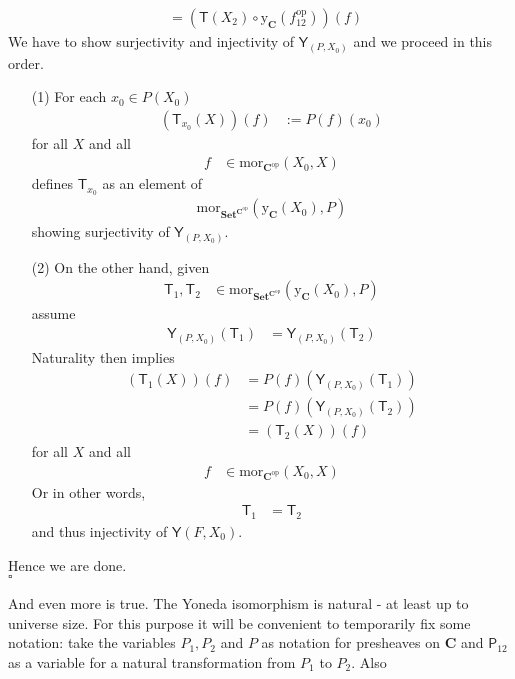 \begin{prf}
\begin{align*}
  &=
  \left(
    \mathsf{T}(X_{2})
    \circ
    \mathrm{y}_{\mathbf{C}}(f_{12}^{\textrm{op}})
  \right)
  (f)
\end{align*}
We have to show surjectivity and injectivity of $\mathsf{Y}_{(P,X_{0})}$ and we proceed in this order.
\begin{enumerate}
\item[(1)]
For each $x_{0} \in P(X_{0})$
\begin{align*}
  (\mathsf{T}_{x_{0}}(X))(f)
  &:=
  P(f)(x_{0})
\end{align*}
for all $X$ and all
\begin{align*}
  f
  &\in
  \mathrm{mor}_{\mathbf{C}^{\mathrm{op}}}
  (X_{0},X)
\end{align*}
defines $\mathsf{T}_{x_{0}}$ as an element of
\begin{align*}
  \mathrm{mor}_{\mathbf{Set}^{\mathbf{C}^{\mathrm{op}}}}
  (\mathrm{y}_{\mathbf{C}}(X_{0}),P)
\end{align*}
showing surjectivity of $\mathsf{Y}_{(P,X_{0})}$.
\item[(2)]
On the other hand, given
\begin{align*}
  \mathsf{T}_{1},\mathsf{T}_{2}
  &\in
  \mathrm{mor}_{\mathbf{Set}^{\mathbf{C}^{\mathrm{op}}}}
  (\mathrm{y}_{\mathbf{C}}(X_{0}),P)
\end{align*}
assume
\begin{align*}
  \mathsf{Y}_{(P,X_{0})}(\mathsf{T}_{1})
  &=
  \mathsf{Y}_{(P,X_{0})}(\mathsf{T}_{2})
\end{align*}
Naturality then implies
\begin{align*}
  (\mathsf{T}_{1}(X))(f)
  &=
  P(f)(\mathsf{Y}_{(P,X_{0})}(\mathsf{T}_{1}))
  \tag{NT}
  \\
  &=
  P(f)(\mathsf{Y}_{(P,X_{0})}(\mathsf{T}_{2}))
  \\
  &=
  (\mathsf{T}_{2}(X))(f)
  \tag{NT}
\end{align*}
for all $X$ and all
\begin{align*}
  f
  &\in
  \mathrm{mor}_{\mathbf{C}^{\mathrm{op}}}(X_{0},X)
\end{align*}
Or in other words,
\begin{align*}
  \mathsf{T}_{1}
  &=
  \mathsf{T}_{2}
\end{align*}
and thus injectivity of $\mathsf{Y}(F,X_{0})$.
\end{enumerate}
Hence we are done.
\\
\phantom{proven}
\hfill
$\square$
\end{prf}
And even more is true. The Yoneda isomorphism is natural - at least up to universe size. For this purpose it will be convenient to temporarily fix some notation: take the variables $P_{1},P_{2}$ and $P$ as notation for presheaves on $\mathbf{C}$ and $\mathsf{P}_{12}$ as a variable for a natural transformation from $P_{1}$ to $P_{2}$. Also
